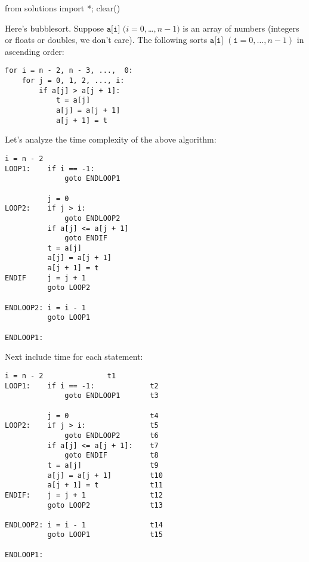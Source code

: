 \begin{python0}
from solutions import *; clear()
\end{python0}


Here's bubblesort. Suppose $\texttt{a[i]}$ $(i=0,
$\ldots$, n-1)$ is an array of numbers (integers or floats or
doubles, we don't care). The following sorts $\texttt{a[i]}$
$(\texttt{i}=0,\ldots,n-1)$ in ascending order:
\begin{Verbatim}[frame=single, fontsize=\footnotesize]
for i = n - 2, n - 3, ...,  0:
    for j = 0, 1, 2, ..., i:
        if a[j] > a[j + 1]:
            t = a[j]
            a[j] = a[j + 1]
            a[j + 1] = t
\end{Verbatim}


Let's analyze the time complexity of the above algorithm:

\begin{Verbatim}[frame=single, fontsize=\footnotesize]
          i = n - 2
LOOP1:    if i == -1:
              goto ENDLOOP1

          j = 0
LOOP2:    if j > i:
              goto ENDLOOP2
          if a[j] <= a[j + 1]
              goto ENDIF    
          t = a[j]
          a[j] = a[j + 1]
          a[j + 1] = t
ENDIF     j = j + 1
          goto LOOP2

ENDLOOP2: i = i - 1
          goto LOOP1

ENDLOOP1:
\end{Verbatim}

Next include time for each statement:
\begin{Verbatim}[frame=single, fontsize=\footnotesize]
          i = n - 2               t1
LOOP1:    if i == -1:             t2
              goto ENDLOOP1       t3

          j = 0                   t4
LOOP2:    if j > i:               t5
              goto ENDLOOP2       t6
          if a[j] <= a[j + 1]:    t7
              goto ENDIF          t8   
          t = a[j]                t9
          a[j] = a[j + 1]         t10
          a[j + 1] = t            t11
ENDIF:    j = j + 1               t12
          goto LOOP2              t13

ENDLOOP2: i = i - 1               t14
          goto LOOP1              t15

ENDLOOP1:
\end{Verbatim}

